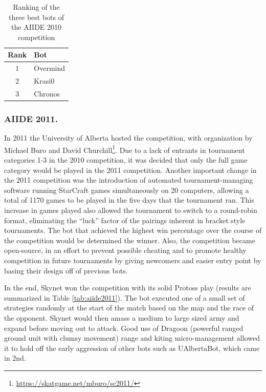 \documentclass{llncs}
\begin{document}
\begin{table}[!t]
\caption{Ranking of the three best bots of the AIIDE 2010 competition}
\label{tab:aiide2010}
\centering
\begin{tabular}{|c|l|}
\hline
{\bfseries Rank} & {\bfseries Bot}\\
\hline
1 & Overmind \\
2 & Krasi0 \\
3 & Chronos \\
\hline
\end{tabular}
\end{table}

\subsubsection{AIIDE 2011.}

In 2011 the University of Alberta hosted the competition, with organization by Michael Buro and
David Churchill\footnote{\url{https://skatgame.net/mburo/sc2011/}}. Due to a lack of entrants in tournament categories 1-3 in the 2010 competition, it was
decided that only the full game category would be played in the 2011 competition. Another important
change in the 2011 competition was the introduction of automated tournament-managing software running
StarCraft games simultaneously on 20 computers, allowing a total of 1170 games to be played in the five days that the tournament ran. 
This increase in games played also allowed the tournament
to switch to a round-robin format, eliminating the ``luck'' factor of the pairings inherent in bracket
style tournaments. The bot that achieved the highest win percentage over the course of the competition would
be determined the winner. Also, the competition became open-source, in an effort 
to prevent possible cheating and to promote healthy competition in future tournaments by giving
newcomers and easier entry point by basing their design off of previous bots.

In the  end, Skynet  won the competition  with its solid  Protoss play
(results  are  summarized   in  Table  \ref{tab:aiide2011}).  The  bot
executed one of a small set of strategies randomly at the start of the
match based on the map and the race of the opponent. Skynet would then
amass a  medium to large  sized army and  expand before moving  out to
attack. Good  use of Dragoon (powerful ranged ground unit with clumsy movement) range and  kiting micro-management allowed
it to hold off the early aggression of other bots such as UAlbertaBot,
which came in 2nd.
\end{document}
